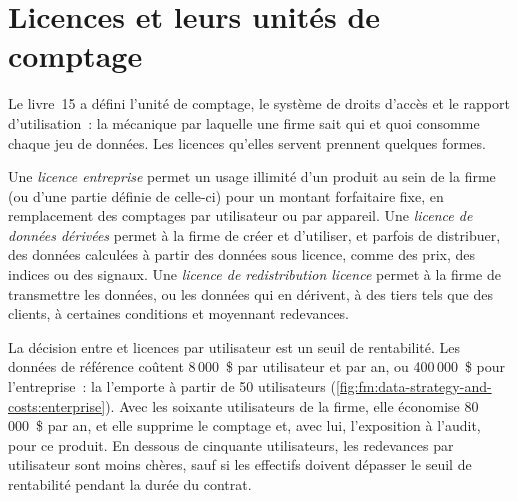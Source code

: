 \section{Licences et leurs unités de comptage}

Le livre~15 a défini l'unité de comptage, le système de droits d'accès et le rapport d'utilisation~: la mécanique par laquelle une firme sait qui et quoi consomme chaque
jeu de données. Les licences qu'elles servent prennent quelques formes.

\begin{definition}\label{def:fm:data-strategy-and-costs:licences}
Une \emph{licence entreprise} permet un usage illimité d'un produit au sein de la firme (ou d'une partie définie de celle-ci) pour un montant forfaitaire fixe,
en remplacement des comptages par utilisateur ou par appareil. Une \emph{licence de données dérivées} permet à la firme de créer et d'utiliser, et
parfois de distribuer, des données calculées à partir des données sous licence, comme des prix, des indices ou des signaux. Une \emph{licence de redistribution
licence} permet à la firme de transmettre les données, ou les données qui en dérivent, à des tiers tels que des clients, à certaines
conditions et moyennant redevances.
\end{definition}

La décision entre  et licences par utilisateur est un seuil de rentabilité. Les données de référence coûtent 8\,000~\$ par utilisateur et par an, ou
400\,000~\$ pour l'entreprise~: la  l'emporte à partir de 50 utilisateurs (\cref{fig:fm:data-strategy-and-costs:enterprise}). Avec les soixante utilisateurs de la firme, elle économise 80\,000~\$ par an, et elle supprime le
comptage et, avec lui, l'exposition à l'audit, pour ce produit. En dessous de cinquante utilisateurs, les redevances par utilisateur sont moins chères, sauf si les effectifs doivent dépasser le seuil
de rentabilité pendant la durée du contrat.

